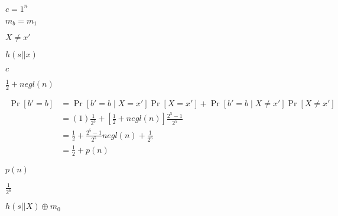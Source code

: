 \documentclass[10pt]{book}
\begin{document}
\begin{mdSnippets}
\begin{mdInlineSnippet}[5623356947ea9e066f6e3da707d52378]%
$c = 1^n$\end{mdInlineSnippet}%
\begin{mdInlineSnippet}[dee6126f090b2a1644a6a378ae210e91]%
$m_b = m_1$\end{mdInlineSnippet}%
\begin{mdInlineSnippet}%
$X \neq x'$\end{mdInlineSnippet}%
\begin{mdInlineSnippet}%
$h(s || x)$\end{mdInlineSnippet}%
\begin{mdInlineSnippet}[4a8a08f09d37b73795649038408b5f33]%
$c$\end{mdInlineSnippet}%
\begin{mdInlineSnippet}[ab44419ef62dd7f368f846396a204358]%
$\frac{1}{2} + negl(n)$\end{mdInlineSnippet}%
\begin{mdDisplaySnippet}%
\[%
\begin{aligned}
\Pr[b' = b] &= \Pr[b' = b \mid X = x']\Pr[X = x'] + \Pr[b' = b \mid X \neq x']\Pr[X \neq x'] \\
&= (1)\frac{1}{2^5} + [\frac{1}{2} + negl(n)]\frac{2^5 - 1}{2^5} \\
&= \frac{1}{2} + \frac{2^5 - 1}{2^5}negl(n) + \frac{1}{2^6} \\
&= \frac{1}{2} + p(n)
\end{aligned}
\]%
\end{mdDisplaySnippet}%
\begin{mdInlineSnippet}%
$p(n)$\end{mdInlineSnippet}%
\begin{mdInlineSnippet}[e4ea0d8a60ccad5d4e32a70054ae04b5]%
$\frac{1}{2^6}$\end{mdInlineSnippet}%
\begin{mdInlineSnippet}[1ef99b361a39580ad02f780a6a51ca21]%
$h(s|| X) \oplus m_0$\end{mdInlineSnippet}%
\begin{mdInlineSnippet}[0f5efa0f9ce4fd4f9e05be426b3fd4e9]%

\end{mdInlineSnippet}
\end{mdSnippets}
\end{document}
